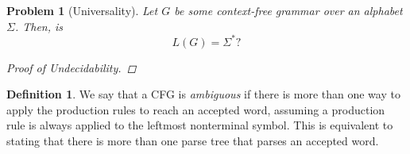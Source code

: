\documentclass[psamsfonts]{amsart}
\newtheorem{prob}[thm]{Problem}
\theoremstyle{definition}
\newtheorem{defn}[thm]{Definition}
\theoremstyle{remark}
\numberwithin{equation}{section}
\begin{document}
\begin{prob}[Universality]
  \label{prob:cfg:universality}
  Let $G$ be some context-free grammar over an alphabet $\Sigma$. Then, is
  \[
    L(G) = \Sigma^*?
  \]
  \begin{proof}[Proof of Undecidability]\todo{}
    
  \end{proof}
\end{prob}

\begin{defn}
We say that a \acl{CFG} is \emph{ambiguous} if there is more than one way to
apply the production rules to reach an accepted word, assuming a production rule
is always applied to the leftmost nonterminal symbol. This is equivalent to
stating that there is more than one parse tree that parses an accepted word.
\end{defn}
\end{document}
